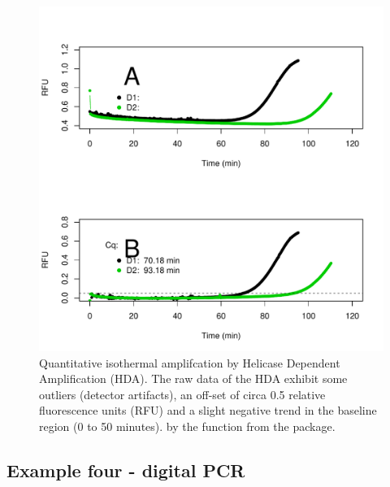 \begin{figure}[htbp]
  \centering
  \includegraphics[clip=true, width=16cm]{figures/qIA.pdf}
  \caption{Quantitative isothermal amplifcation by Helicase Dependent 
Amplification (HDA).  The raw data of the HDA exhibit some outliers 
(detector artifacts), an off-set of circa 0.5 relative fluorescence units (RFU) 
and a slight negative trend in the baseline region (0 to 50 minutes). 
 by the  function from the  package.}
  \label{figure:qIA}
\end{figure}


\subsection{Example four - digital PCR}

